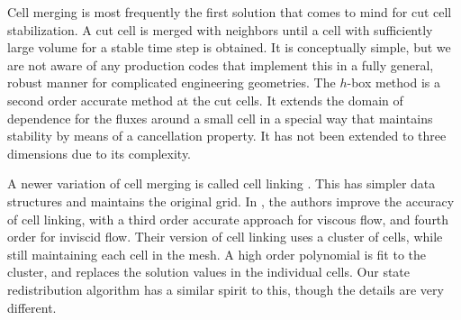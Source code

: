 Cell merging \cite{icm-2003,Chung:2006}  is most frequently the first solution 
that comes to mind for cut cell stabilization. A cut cell is merged with
neighbors until a cell with sufficiently large volume for a stable time
step is obtained. 
It is conceptually simple, but 
we are not aware of any production codes that implement this in a fully
general, robust manner for complicated engineering geometries. 
The $h$-box method \cite{mjb-hel-rjl:hbox2,mjb-hel:hboxsimple}
is a second order accurate method at the cut cells. It extends the 
domain of dependence for the fluxes around a small cell in a 
special way that maintains stability by means of a cancellation
property. It  has not been extended to
three dimensions due to its complexity. 

A newer variation of cell merging is called cell linking \cite{cecereGiacomazzi,
KirkpatrickEtAl:2003, HuKhooAdamsHuang:2006,Chung:2006}.
This has simpler data structures and maintains the original grid. 
In \cite{BalajiMenon:2016}, the authors improve the accuracy of cell linking,
with a third order accurate approach for viscous flow,  and fourth order for 
inviscid flow. 
Their version of cell linking uses a cluster of cells, while still
maintaining each cell in the mesh.  A high order polynomial is fit to
the cluster, and replaces the solution values in the individual cells.
Our state redistribution algorithm has a similar spirit to this, though the 
details are very different. 


